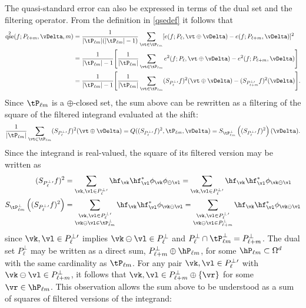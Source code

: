 \documentclass[graybox]{svmult}
\DeclareMathOperator{\qse}{qse}
\begin{document}
The quasi-standard error can also be expressed in terms of the dual set and the filtering operator.  From the definition in \eqref{qsedef} it follows that
\begin{align*}
\qse^2(f;P_{\ell+m},\vDelta,m) &= \frac{1}{\lvert\tP_{\ell m}\rvert  (\lvert\tP_{\ell m}\rvert -1)} \sum_{\vt \in \tP_{\ell m}}  [e(f;P_{\ell},\vt\oplus\vDelta) - e(f;P_{\ell+m},\vDelta)]^2 \\
&= \frac{1}{\lvert \tP_{\ell m}\rvert -1} \Bigg[\frac{1}{\lvert\tP_{\ell m}\rvert} \sum_{\vt \in \tP_{\ell m}}  e^2(f;P_{\ell},\vt\oplus\vDelta) - e^2(f;P_{\ell+m},\vDelta) \Bigg] \\
&= \frac{1}{\lvert \tP_{\ell m}\rvert -1} \Bigg[\frac{1}{\lvert\tP_{\ell m}\rvert} \sum_{\vt \in \tP_{\ell m}}  (S_{P_{\ell}^{\perp}{}'}f)^2(\vt\oplus\vDelta) - (S_{P_{\ell+m}^{\perp}\!\!\!\!\!\!{}'}\ \, f)^2(\vDelta) \Bigg].
\end{align*}
Since $\tP_{\ell m}$ is a $\oplus$-closed set, the sum above can be rewritten as a filtering of the square of the filtered integrand evaluated at the shift:
\[
\frac{1}{\lvert\tP_{\ell m}\rvert} \sum_{\vt \in \tP_{\ell m}}  (S_{P_{\ell}^{\perp}{}'}f)^2(\vt\oplus\vDelta) =Q((S_{P_{\ell}^{\perp}{}'}f)^2,\tP_{\ell m},\vDelta) = S_{\tP_{\ell m}^{\perp}}\left((S_{P_{\ell}^{\perp}{}'}f)^2\right)(\vDelta).
\]
Since the integrand is real-valued, the square of its filtered version may be written as 
\begin{align*}
(S_{P_{\ell}^{\perp}{}'}f)^2
& = \sum_{\vk,\vl \in P_{\ell}^{\perp}{}'} \hf_{\vk} \hf_{\vl}^* \phi_{\vk} \phi_{\ominus \vl} = \sum_{\vk,\vl \in P_{\ell}^{\perp}{}'} \hf_{\vk} \hf_{\vl}^* \phi_{\vk \ominus \vl} \\
S_{\tP_{\ell m}^{\perp}}\left( (S_{P_{\ell}^{\perp}{}'}f)^2 \right) &
= \sum_{\substack{\vk,\vl \in P_{\ell}^{\perp}{}' \\ \vk \ominus \vl \in \tP_{\ell m}^{\perp}} } \hf_{\vk} \hf_{\vl}^* \phi_{\vk \ominus \vl}
= \sum_{\substack{\vk,\vl \in P_{\ell}^{\perp}{}' \\ \vk \ominus \vl \in P_{\ell + m}^{\perp} } } \hf_{\vk} \hf_{\vl}^* \phi_{\vk \ominus \vl}
\end{align*}
since $\vk,\vl \in P_{\ell}^{\perp}{}'$ implies $\vk \ominus \vl \in P_{\ell}^{\perp}$ and $P_{\ell}^{\perp} \cap \tP_{\ell m}^{\perp} =  P_{\ell + m}^{\perp}$.  The dual set $P_{\ell}^{\perp}$ may be written as a direct sum, $P_{\ell + m}^{\perp} \oplus \hP_{\ell m}$, for some $\hP_{\ell m} \subset \Omega^d$ with the same cardinality as $\tP_{\ell m}$.  For any pair $\vk,\vl \in P_{\ell}^{\perp}{}'$ with $\vk \ominus \vl \in P_{\ell + m}^{\perp}$, it follows that $\vk,\vl \in P_{\ell + m}^{\perp} \oplus \{\vr\}$ for some $\vr \in \hP_{\ell m}$.  This observation allows the sum above to be understood as a sum of squares of filtered versions of the integrand: 
\end{document}
